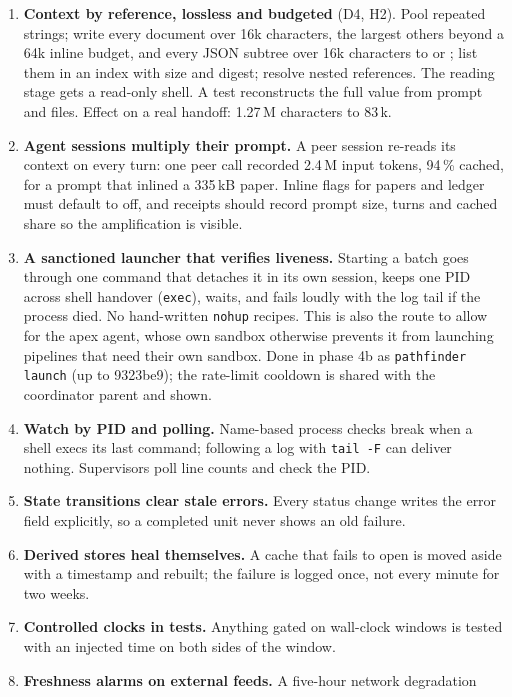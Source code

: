 \documentclass[11pt,a4paper]{article}
\begin{document}
\begin{enumerate}[label=\textbf{S\arabic*}]
\item \textbf{Context by reference, lossless and budgeted} (D4, H2). Pool repeated
  strings; write every document over 16k characters, the largest others beyond a
  64k inline budget, and every JSON subtree over 16k characters to
   or ; list them in an index with size and
  digest; resolve nested references. The reading stage gets a read-only shell. A
  test reconstructs the full value from prompt and files. Effect on a real
  handoff: 1.27\,M characters to 83\,k.
\item \textbf{Agent sessions multiply their prompt.} A peer session re-reads its
  context on every turn: one peer call recorded 2.4\,M input tokens, 94\,\% cached,
  for a prompt that inlined a 335\,kB paper. Inline flags for papers and ledger
  must default to off, and receipts should record prompt size, turns and cached
  share so the amplification is visible.
\item \textbf{A sanctioned launcher that verifies liveness.} Starting a batch goes
  through one command that detaches it in its own session, keeps one PID across
  shell handover (\texttt{exec}), waits, and fails loudly with the log tail if the
  process died. No hand-written \texttt{nohup} recipes. This is also the route to
  allow for the apex agent, whose own sandbox otherwise prevents it from launching
  pipelines that need their own sandbox.
  Done in phase 4b as \texttt{pathfinder launch} (up to 9323be9); the rate-limit cooldown is shared with the coordinator parent and shown.
\item \textbf{Watch by PID and polling.} Name-based process checks break when a
  shell execs its last command; following a log with \texttt{tail -F} can deliver
  nothing. Supervisors poll line counts and check the PID.
\item \textbf{State transitions clear stale errors.} Every status change writes the
  error field explicitly, so a completed unit never shows an old failure.
\item \textbf{Derived stores heal themselves.} A cache that fails to open is moved
  aside with a timestamp and rebuilt; the failure is logged once, not every minute
  for two weeks.
\item \textbf{Controlled clocks in tests.} Anything gated on wall-clock windows is
  tested with an injected time on both sides of the window.
\item \textbf{Freshness alarms on external feeds.} A five-hour network degradation

\end{enumerate}
\end{document}

